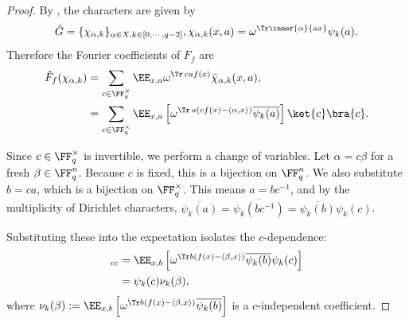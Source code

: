 \begin{proof}\leanok
    By , the characters are given by
    \[
    \hat{G} = \{\chi_{\alpha, k}\}_{\alpha \in X, k \in [0, \cdots, q-2]}, \chi_{\alpha, k}(x,a) = \omega^{\Tr \inner{\alpha}{a x}} \psi_k(a).
    \]
    Therefore the Fourier coefficients of $F_f$ are
    \begin{align}
        \hat{F}_f(\chi_{\alpha, k}) 
        & = \sum_{c \in \FF_q^\times } \EE_{x, a} \omega^{\Tr\, c a f(x)} \bar{\chi}_{\alpha, k}(x, a) , \nonumber \\
        & = \sum_{c \in \FF_q^\times }\EE_{x,a} \left[ \omega^{\Tr\, a(cf(x) - \langle \alpha, x \rangle)} \overline{\psi_k(a)} \right] \ket{c}\bra{c}.
    \end{align}
    

Since $c \in \FF_q^\times$ is invertible, we perform a change of variables. Let $\alpha = c\beta$ for a fresh $\beta \in \FF_q^n$. Because $c$ is fixed, this is a bijection on $\FF_q^n$. 
We also substitute $b = ca$, which is a bijection on $\FF_q^\times$. 
This means $a = bc^{-1}$, and by the multiplicity of Dirichlet characters, $\overline{\psi_k(a)} = \overline{\psi_k(bc^{-1})} = \overline{\psi_k(b)}\psi_k(c)$.

Substituting these into the expectation isolates the $c$-dependence: 
\begin{align} 
    [\hat{F}_f(\chi_{c\beta, k})]_{cc} &= \EE_{x,b} \left[ \omega^{\Tr b(f(x) - \langle \beta, x \rangle)} \overline{\psi_k(b)}\psi_k(c) \right] \nonumber \\
    &= \psi_k(c) \nu_k(\beta), 
\end{align}
where $\nu_k(\beta) := \EE_{x,b} \left[ \omega^{\Tr b(f(x) - \langle \beta, x \rangle)} \overline{\psi_k(b)} \right]$ is a $c$-independent coefficient.    
\end{proof}



